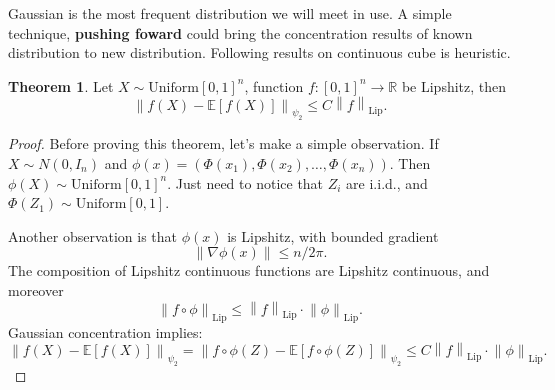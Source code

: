 \documentclass[9pt,onesided]{article}
\newcommand{\nm}[1]{\left\lVert#1\right\rVert}
\newcommand{\re}{\mathbb{R}}
\newcommand{\ex}[1]{\mathbb{E}[#1]}
\newcommand{\mc}{\color{BlueViolet}}
\renewcommand{\le}{\leqslant}
\theoremstyle{definition}
\newtheorem{theorem}{\mc Theorem}
\begin{document}
 Gaussian is the most frequent distribution we will meet in use. A simple technique, \textbf{pushing foward} could bring the concentration results of known distribution to new distribution. Following results on continuous cube is heuristic.

\begin{theorem}
    Let $X\sim \mathrm{Uniform}[0,1]^n$, function $f: [0,1]^n\to \re$ be Lipshitz, then
    \begin{equation*}
         \nm{f(X)-\ex{f(X)}}_{\psi_2} \le C \nm{f}_{\mathrm{Lip}}.
     \end{equation*}
\end{theorem}

\begin{proof}
    Before proving this theorem, let's make a simple observation. If $X\sim N(0,I_n)$ and $\phi(x)=(\Phi(x_1),\Phi(x_2),\dots,\Phi(x_n))$. Then $\phi(X)\sim \mathrm{Uniform}[0,1]^n$. Just need to notice that $Z_i$ are i.i.d., and $\Phi(Z_1)\sim \mathrm{Uniform}[0,1]$. 

    Another observation is that $\phi(x)$ is Lipshitz, with bounded gradient 
    \begin{equation*}
        \nm{\nabla \phi(x)}\le n/ 2\pi.
    \end{equation*}
    The composition of Lipshitz continuous functions are Lipshitz continuous, and moreover
    \begin{equation*}
    \nm{ f\circ \phi}_{\mathrm{Lip}}\le \nm{ f}_{\mathrm{Lip}}\cdot \nm{\phi}_{\mathrm{Lip}}.
    \end{equation*}
    Gaussian concentration implies:
    \begin{equation*}
        \nm{f(X)- \ex{f(X)}}_{\psi_2}=\nm{f\circ \phi(Z) -\ex{f\circ \phi (Z)}}_{\psi_2}\le C\nm{ f}_{\mathrm{Lip}}\cdot \nm{\phi}_{\mathrm{Lip}}.
    \end{equation*}
\end{proof}
\end{document}
